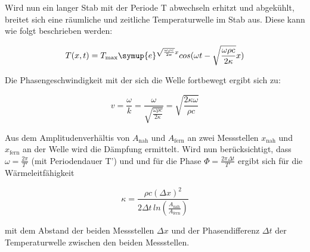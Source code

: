       Wird nun ein langer Stab mit der Periode T abwechseln erhitzt und abgekühlt, breitet sich eine räumliche und zeitliche Temperaturwelle im Stab aus. 
      Diese kann wie folgt beschrieben werden: 

      \begin{equation}
      T(x,t) = T_\text{max} \symup{e}^{\sqrt{\frac{\omega \rho c}{2 \kappa}}x} cos(\omega t - \sqrt{\frac{\omega \rho c}{2 \kappa}} x)
        \label{eqn:temperaturwelle}
      \end{equation}  

      Die Phasengeschwindigkeit mit der sich die Welle fortbewegt ergibt sich zu:

      \begin{equation}
      v = \frac{\omega}{k} = \frac{\omega}{\sqrt{\frac{\omega \rho c}{2 \kappa}}} = \sqrt{\frac{2 \kappa \omega}{\rho c}}
        \label{eqn:phasengeschwindigkeit}
      \end{equation}

      Aus dem Amplitudenverhältis von $A_\text{nah}$ und $A_\text{fern}$ an zwei Messstellen $x_\text{nah}$ und $x_\text{fern}$ an der Welle wird die Dämpfung ermittelt.
      Wird nun berücksichtigt, dass $\omega = \frac{2 \pi}{T'}$ (mit Periodendauer T') und und für die Phase $\Phi = \frac{2 \pi \Delta t}{T'}$ ergibt sich für die Wärmeleitfähigkeit

      \begin{equation}
      \kappa = \frac{\rho c (\Delta x)^2}{2 \Delta t \, ln (\frac{A_\text{nah}}{A_\text{fern}})}
        \label{eqn:waermeleitfaehigkeit}
      \end{equation}

      mit dem Abstand der beiden Messstellen $\Delta x$ und der Phasendifferenz $\Delta t$ der Temperaturwelle zwischen den beiden Messstellen.